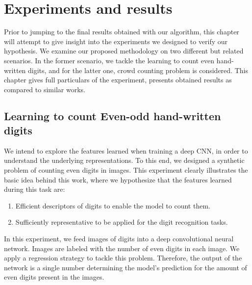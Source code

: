 \newpage
\chapter{Experiments and results}
\label{sec:experiments}

Prior to jumping to the final results obtained with our algorithm, this chapter will attempt to give insight into the experiments we designed to verify our hypothesis. We examine our proposed methodology on two different but related scenarios. In the former scenario, we tackle the learning to count even hand-written digits, and for the latter one, crowd counting problem is considered. This chapter gives full particulars of the experiment, presents obtained results as compared to similar works.

\section{Learning to count Even-odd hand-written digits}

We intend to explore the features learned when training a deep CNN, in order to understand the underlying representations. To this end, we designed a synthetic problem of counting even digits in images. This experiment clearly illustrates the basic idea behind this work, where we hypothesize that the features learned during this task are:
\begin{enumerate}
\item Efficient descriptors of digits to enable the model to count them.
\item Sufficiently representative to be applied for the digit recognition tasks. 
\end{enumerate}

In this experiment, we feed images of digits into a deep convolutional neural network. Images are labeled with the number of even digits in each image. We apply a regression strategy to tackle this problem. Therefore, the output of the network is a single number determining the model's prediction for the amount of even digits present in the images. 
 

